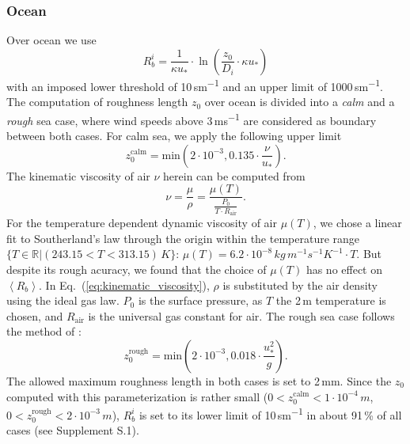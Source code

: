 \documentclass[gmd, manuscript]{copernicus}
\begin{document}
\subsubsection*{Ocean}
Over ocean we use \citep[Eq.~(54),][]{ACP:Simpson2012}
\begin{equation}
  R_b^i = \frac{1}{\kappa u_*}\cdot\ln\left({\frac{z_0}{D_i}\cdot \kappa u_*}\right)
\end{equation}
with an imposed lower threshold of 10\,\unit{sm^{-1}} and an upper limit of 1000\,\unit{sm^{-1}}. The computation of roughness length $z_0$ over ocean is divided into a \emph{calm} and a \emph{rough} sea case, where wind speeds above 3\,\unit{ms^{-1}} are considered as boundary between both cases. For calm sea, we apply the following upper limit \citep[][with a slightly higher coefficient of $0.135$]{Hinze1975,Garratt1992}
\begin{equation}
  z_0^\text{calm} = \text{min}\left(2\cdot10^{-3}, 0.135 \cdot \frac{\nu}{u_*}\right).
\end{equation}
The kinematic viscosity of air $\nu$ herein can be computed from 
\begin{equation}
  \nu = \frac{\mu}{\rho} = \frac{\mu(T)}{\frac{P_0}{T\cdot R_\text{air}}}.
  \label{eq:kinematic_viscosity}
\end{equation}
For the temperature dependent dynamic viscosity of air $\mu(T)$, we chose a linear fit to Southerland's law through the origin within the temperature range $\{T \in \mathbb{R} | (243.15 < T < 313.15)\,\unit{K}\}$: $\mu(T) = 6.2\cdot 10^{-8}\,\unit{kg \, m^{-1} s^{-1} K^{-1}} \cdot T$. But despite its rough acuracy, we found that the choice of $\mu(T)$ has no effect on $\left<R_b\right>$. In Eq.~(\ref{eq:kinematic_viscosity}), $\rho$ is substituted by the air density using the ideal gas law. $P_0$ is the surface pressure, as $T$ the 2\,\unit{m} temperature is chosen, and $R_\text{air}$ is the universal gas constant for air.
The rough sea case follows the method of \citet{QJRMS:Charnock1955,JPO:Wu1980}:
\begin{equation}
  z_0^\text{rough} = \text{min}\left(2\cdot10^{-3}, 0.018 \cdot \frac{u^2_*}{g}\right).
\end{equation}
The allowed maximum roughness length in both cases is set to 2\,\unit{mm}. Since the $z_0$ computed with this parameterization is rather small ($0 < z_0^\text{calm} < 1\cdot 10^{-4}\,\unit{m}$, $0 < z_0^\text{rough} < 2 \cdot 10^{-3}\,\unit{m}$), $R^i_b$ is set to its lower limit of 10\,\unit{sm^{-1}} in about 91\,\unit{\%} of all cases (see Supplement S.1). 
\end{document}
